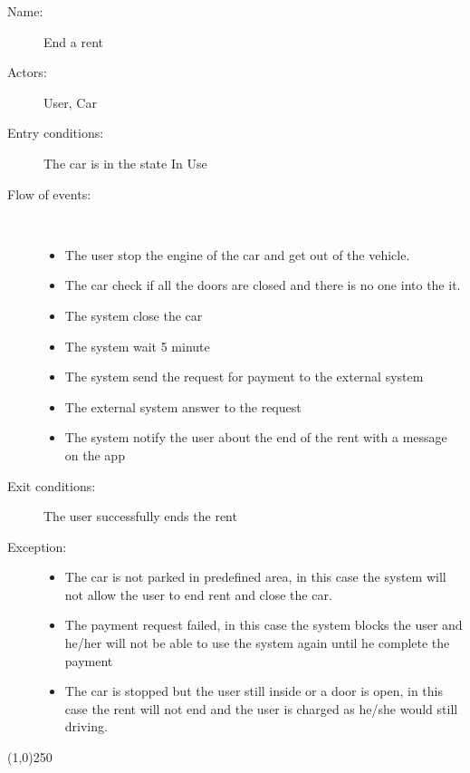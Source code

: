 \begin{description}
	\item[Name:] End a rent
	\item[Actors:] User, Car 
	\item[Entry conditions:] The car is in the state In Use
	\item[Flow of events:]  \ \\
		\begin{itemize}
			\item The user stop the engine of the car and get out of the vehicle.
			\item The car check if all the doors are closed and there is no one into the it.
			\item The system close the car
			\item The system wait 5 minute
			\item The system send the request for payment to the external system
			\item The external system answer to the request
			\item The system notify the user about the end of the rent with a message on the app
		\end{itemize}
	\item[Exit conditions:] The user successfully ends the rent
	\item [Exception:] 
		\begin{itemize}
			\item The car is not parked in predefined area, in this case the system will not allow the user to end rent and close the car. 
			\item The payment request failed, in this case the system blocks the user and he/her will not be able to use the system  again until he complete the payment
			\item The car is stopped but the user still inside or a door is open, in this case the rent will not end and the user is charged as he/she would still driving.
		\end{itemize}
\end{description}

\begin{center}
\line(1,0){250}
\end{center}

